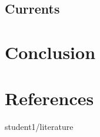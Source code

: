 \subsection{Currents}



\section{Conclusion}

\section*{References}
\begin{btSect}{student1/literature}
\btPrintAll
\end{btSect}